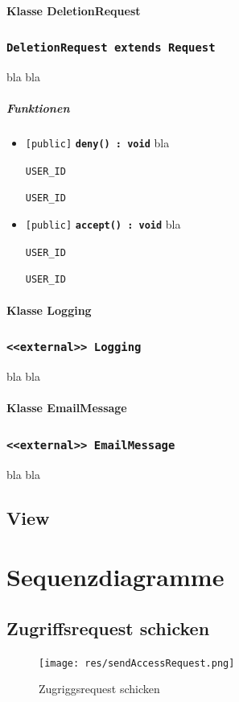 \documentclass[parskip=full,11pt]{scrartcl}
\makeatletter
\newcommand{\lstInline}[2][,]{%
	\begingroup%
	\lstset{#1}%
	\begin{lrbox}{\mylisting}\lstinline!#2!\end{lrbox}%
	\setlength{\@tempdima}{\linegoal}%
	\ifdim\wd\mylisting>\@tempdima\hfill\\\fi%
	\lstinline!#2!%
	\endgroup%
}
\newcommand{\class}[1]{\subsubsection*{\lstinline[basicstyle=\ttfamily\large]{#1}}}
\newcommand{\mtd}[5]{\lstinline{[#4]} \textbf{\lstinline{#1(#3) : #2}} \newline #5}
\newcommand{\inlinecode}[1]{\lstInline[breaklines=true]{#1}}
\makeatother
\begin{document}
  \paragraph*{Klasse DeletionRequest}
 \class{DeletionRequest extends Request}
 bla bla
 
\subparagraph*{Funktionen}  %
\begin{itemize}
	\item \mtd{deny}{void}{}{public}{
	bla  \inlinecode{USER_ID}
	}
	
	\item \mtd{accept}{void}{}{public}{
	bla  \inlinecode{USER_ID}
	}
\end{itemize}

  \paragraph*{Klasse Logging}
 \class{<<external>> Logging}
 bla bla
 
 
  \paragraph*{Klasse EmailMessage}
 \class{<<external>> EmailMessage}
 bla bla
 
\subsection{View} 
\newpage 
 \section{Sequenzdiagramme}
 \subsection{Zugriffsrequest schicken}
 \begin{figure}[ht!]
 	\centering
 	\texttt{[image: res/sendAccessRequest.png]}
 	\caption{Zugriggsrequest schicken}
 	\label{fig:sendAccReq}
 \end{figure}
 
\end{document}
